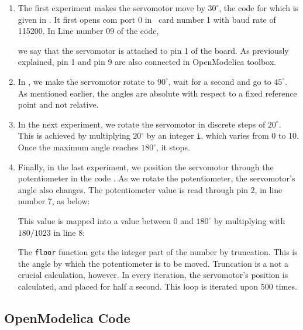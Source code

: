 \begin{enumerate}
  \item The first experiment makes the servomotor move by $30^\circ$,
        the code for which is given in .
        It first opens com port 0 in \arduino\ card number 1 with baud rate
        of 115200.  In Line number 09 of the code, \ie\
        
        we say that the servomotor is attached to pin 1 of the board.
        As previously explained, pin 1 and pin 9 are also connected in OpenModelica
        toolbox.
        
  \item In , we make the servomotor rotate
        to $90^\circ$, wait for a second and go to $45^\circ$.  As mentioned
        earlier, the angles are absolute with respect to a fixed reference
        point and not relative.  
        
  \item In the next experiment, we rotate the servomotor in discrete
        steps of $20^\circ$.  This is achieved by multiplying $20^\circ$ by
        an integer {\tt i}, which varies from 0 to 10.  Once the maximum
        angle reaches $180^\circ$, it stops.  
        
  \item Finally, in the last experiment, we position the servomotor
        through the potentiometer in the code .  As we
        rotate the potentiometer, the servomotor's angle also changes.  The
        potentiometer value is read through pin 2, in line number 7, as
        below:
        
        This value is mapped into a value between 0 and $180^\circ$ by
        multiplying with $180/1023$ in line 8:
        
        The {\tt floor} function gets the integer part of the number by
        truncation.  This is the angle by which the potentiometer is to be
        moved.  Truncation is a not a crucial calculation, however.  In
        every iteration, the servomotor's position is calculated, and placed
        for half a second.  This loop is iterated upon 500 times.
        
\end{enumerate}

\subsection{OpenModelica Code}
\lstset{style=mystyle}
\label{sec:servo-OpenModelica-code}

